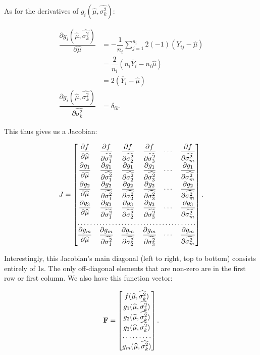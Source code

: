 \documentclass[12pt,a4paper]{article}
\newcommand{\ovY}{\overline{Y}}
\newcommand{\wmu}{\widehat{\mu}}
\newcommand{\wst}[1]{\widehat{\sigma^2_{#1}}}
\begin{document}
	As for the derivatives of $g_i(\wmu, \wst{k})$:
	
	\begin{align*}
		\dfrac{\partial g_i(\wmu, \wst{k})}{\partial \wmu} &= -\dfrac{1}{n_i} \sum_{j=1}^{n_i} 2(-1)(Y_{ij}-\wmu) \\
		&= \dfrac{2}{n_i} (n_i\ovY_i - n_i\wmu) \\
		&= 2(\ovY_i-\wmu) \\
		\dfrac{\partial g_i(\wmu, \wst{k})}{\partial \wst{k}} &= \delta_{ik}.
	\end{align*}

	This thus gives us a Jacobian:
	
	\begin{align*}
		J = \left[\begin{matrix}
			\dfrac{\partial f}{\partial \wmu} & \dfrac{\partial f}{\partial \wst{1}} & \dfrac{\partial f}{\partial \wst{2}} & \dfrac{\partial f}{\partial \wst{3}} & \cdots & \dfrac{\partial f}{\partial \wst{m}} \\
			\dfrac{\partial g_1}{\partial \wmu} & \dfrac{\partial g_1}{\partial \wst{1}} & \dfrac{\partial g_1}{\partial \wst{2}} & \dfrac{\partial g_1}{\partial \wst{3}} & \cdots & \dfrac{\partial g_1}{\partial \wst{m}} \\
			\dfrac{\partial g_2}{\partial \wmu} & \dfrac{\partial g_2}{\partial \wst{1}} & \dfrac{\partial g_2}{\partial \wst{2}} & \dfrac{\partial g_2}{\partial \wst{3}} & \cdots & \dfrac{\partial g_2}{\partial \wst{m}} \\
			\dfrac{\partial g_3}{\partial \wmu} & \dfrac{\partial g_3}{\partial \wst{1}} & \dfrac{\partial g_3}{\partial \wst{2}} & \dfrac{\partial g_3}{\partial \wst{3}} & \cdots & \dfrac{\partial g_3}{\partial \wst{m}} \\
			\hdotsfor{6} \\
			\dfrac{\partial g_m}{\partial \wmu} & \dfrac{\partial g_m}{\partial \wst{1}} & \dfrac{\partial g_m}{\partial \wst{2}} & \dfrac{\partial g_m}{\partial \wst{3}} & \cdots & \dfrac{\partial g_m}{\partial \wst{m}}
		\end{matrix}\right].
	\end{align*}

	Interestingly, this Jacobian's main diagonal (left to right, top to bottom) consists entirely of 1s. The only off-diagonal elements that are non-zero are in the first row or first column. We also have this function vector:
	
	\begin{align*}
		\mathbf{F} = \left[
		\begin{matrix}
			f(\wmu, \wst{k}) \\
			g_1(\wmu, \wst{k}) \\
			g_2(\wmu, \wst{k}) \\
			g_3(\wmu, \wst{k}) \\
			\hdotsfor{1} \\
			g_m(\wmu, \wst{k})
		\end{matrix}
	\right].
	\end{align*}
\end{document}

